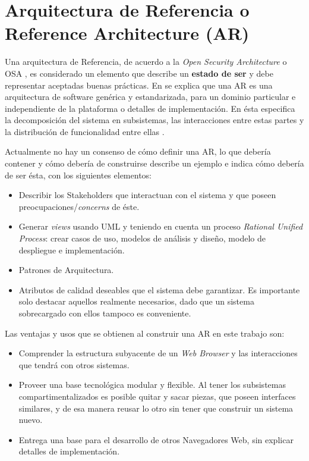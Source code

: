 

\section{Arquitectura de Referencia o Reference Architecture (AR)}
\label{chap2:ArqRef}

Una arquitectura de Referencia, de acuerdo a la \textit{Open Security Architecture} o OSA \cite{openSecArch}, es considerado un elemento que describe un \textbf{estado de ser} y debe representar aceptadas buenas prácticas. En \cite{Avgeriou2003, Galster2011a} se explica que una AR es una arquitectura de software genérica y estandarizada, para un dominio particular e independiente de la plataforma o detalles de implementación. En ésta especifica la decomposición del sistema en subsistemas, las interacciones entre estas partes y la distribución de funcionalidad entre ellas \cite{Bass2012}. 

Actualmente no hay un consenso de cómo definir una AR, lo que debería contener y cómo debería de construirse \cite{Avgeriou2003, Galster2011a} describe un ejemplo e indica cómo debería de ser ésta, con los siguientes elementos:
\begin{itemize}
    \item Describir los Stakeholders que interactuan con el sistema y que poseen preocupaciones/\textit{concerns} de éste.
    \item Generar \textit{views} usando UML y teniendo en cuenta un proceso \textit{Rational Unified Process}: crear casos de uso, modelos de análisis y diseño, modelo de despliegue e implementación.
    \item Patrones de Arquitectura.
    \item Atributos de calidad deseables que el sistema debe garantizar. Es importante solo destacar aquellos realmente necesarios, dado que un sistema sobrecargado con ellos tampoco es conveniente.
\end{itemize}

Las ventajas y usos que se obtienen al construir una AR en este trabajo son:
\begin{itemize}
    \item Comprender la estructura subyacente de un \textit{Web Browser} y las interacciones que tendrá con otros sistemas.
    \item Proveer una base tecnológica modular y flexible. Al tener los subsistemas compartimentalizados es posible quitar y sacar piezas, que poseen interfaces similares, y de esa manera reusar lo otro sin tener que construir un sistema nuevo.
    \item Entrega una base para el desarrollo de otros Navegadores Web, sin explicar detalles de implementación.
\end{itemize}

